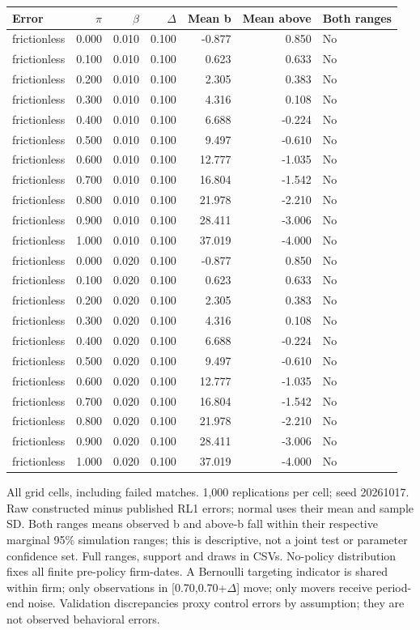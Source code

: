 \begin{tabular}{lrrrrrl}
\toprule
Error & $\pi$ & $\beta$ & $\Delta$ & Mean b & Mean above & Both ranges \\
\midrule
frictionless & 0.000 & 0.010 & 0.100 & -0.877 & 0.850 & No \\
frictionless & 0.100 & 0.010 & 0.100 & 0.623 & 0.633 & No \\
frictionless & 0.200 & 0.010 & 0.100 & 2.305 & 0.383 & No \\
frictionless & 0.300 & 0.010 & 0.100 & 4.316 & 0.108 & No \\
frictionless & 0.400 & 0.010 & 0.100 & 6.688 & -0.224 & No \\
frictionless & 0.500 & 0.010 & 0.100 & 9.497 & -0.610 & No \\
frictionless & 0.600 & 0.010 & 0.100 & 12.777 & -1.035 & No \\
frictionless & 0.700 & 0.010 & 0.100 & 16.804 & -1.542 & No \\
frictionless & 0.800 & 0.010 & 0.100 & 21.978 & -2.210 & No \\
frictionless & 0.900 & 0.010 & 0.100 & 28.411 & -3.006 & No \\
frictionless & 1.000 & 0.010 & 0.100 & 37.019 & -4.000 & No \\
frictionless & 0.000 & 0.020 & 0.100 & -0.877 & 0.850 & No \\
frictionless & 0.100 & 0.020 & 0.100 & 0.623 & 0.633 & No \\
frictionless & 0.200 & 0.020 & 0.100 & 2.305 & 0.383 & No \\
frictionless & 0.300 & 0.020 & 0.100 & 4.316 & 0.108 & No \\
frictionless & 0.400 & 0.020 & 0.100 & 6.688 & -0.224 & No \\
frictionless & 0.500 & 0.020 & 0.100 & 9.497 & -0.610 & No \\
frictionless & 0.600 & 0.020 & 0.100 & 12.777 & -1.035 & No \\
frictionless & 0.700 & 0.020 & 0.100 & 16.804 & -1.542 & No \\
frictionless & 0.800 & 0.020 & 0.100 & 21.978 & -2.210 & No \\
frictionless & 0.900 & 0.020 & 0.100 & 28.411 & -3.006 & No \\
frictionless & 1.000 & 0.020 & 0.100 & 37.019 & -4.000 & No \\
\bottomrule
\end{tabular}
\par\medskip
\footnotesize All grid cells, including failed matches. 1,000 replications per cell; seed 20261017. Raw constructed minus published RL1 errors; normal uses their mean and sample SD. Both ranges means observed b and above-b fall within their respective marginal 95\% simulation ranges; this is descriptive, not a joint test or parameter confidence set. Full ranges, support and draws in CSVs. No-policy distribution fixes all finite pre-policy firm-dates. A Bernoulli targeting indicator is shared within firm; only observations in [0.70,0.70+$\Delta$] move; only movers receive period-end noise. Validation discrepancies proxy control errors by assumption; they are not observed behavioral errors.
\endgroup

